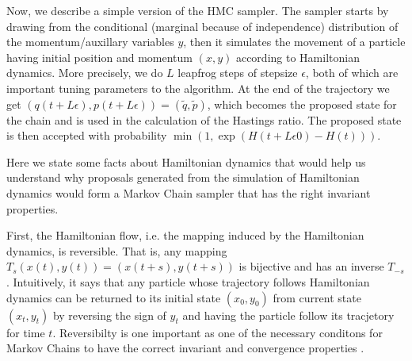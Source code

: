 \documentclass[]{report}
\begin{document}
 
Now, we describe a simple version of the HMC sampler.
The sampler starts by drawing from the conditional (marginal because of
independence) distribution of the momentum/auxillary variables $y$, then it simulates the
movement of a particle having initial position and momentum $(x,y)$ according to
Hamiltonian dynamics. More precisely, we do $L$ leapfrog steps of stepsize
$\epsilon$, both of which are important tuning parameters to the algorithm.
At the end of the trajectory we get $(q(t+L \epsilon),p(t+L \epsilon)) =
(\tilde{q}, \tilde{p})$, which becomes the proposed state for the chain and
is used in the calculation of the Hastings ratio. The proposed state is then accepted with probability $\min (1, \exp(H(t+L\epsilon0)-H(t)))$. 

Here we state some facts about Hamiltonian dynamics that would help us
understand why proposals generated from the simulation of Hamiltonian dynamics would
form a Markov Chain sampler that has the right invariant properties. 

First, the Hamiltonian flow, i.e. the mapping induced by the Hamiltonian
dynamics, is reversible. That is, any mapping $T_s(x(t),y(t)) =(x(t+s),y(t+s)) $
is bijective and has an inverse $T_{-s}$. Intuitively, it says that any particle
whose trajectory follows Hamiltonian dynamics can be returned to its initial
state $(x_0,y_0)$ from current state $(x_t,y_t)$ by reversing the sign of $y_t$
and having the particle follow its tracjetory for time $t$. Reversibilty is one
important as one of the necessary conditons for Markov Chains to have the
correct invariant and
convergence properties \cite{robert2013monte}. 
\end{document}

